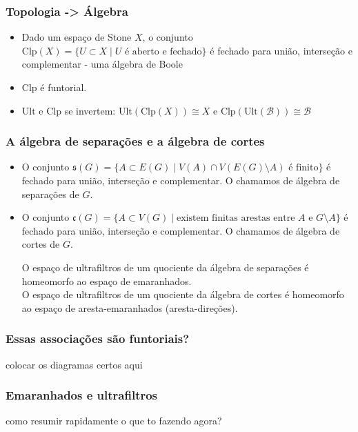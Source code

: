 \begin{frame}{}
\frametitle{Topologia -> Álgebra}
    \begin{itemize}
        \item Dado um espaço de Stone $X$, o conjunto $\text{Clp}(X) = \{U \subset X \mid U \text{ é aberto e fechado}\}$ é fechado para união, interseção e complementar - uma álgebra de Boole \pause
        \item $\text{Clp}$ é funtorial. \pause
        \item $\text{Ult}$ e $\text{Clp}$ se invertem: $\text{Ult}(\text{Clp}(X)) \cong X$  e $\text{Clp}(\text{Ult}(\mathcal{B})) \cong \mathcal{B}$
    \end{itemize} 
\end{frame}

\begin{frame}{}
\frametitle{A álgebra de separações e a álgebra de cortes}
    \begin{itemize}
        \item O conjunto $\mathfrak{s}(G) = \{A \subset E(G) \mid V(A) \cap V(E(G) \setminus A) \text{ é finito}\}$ é fechado para união, interseção e complementar. O chamamos de álgebra de separações de $G$. \pause
        \item O conjunto $\mathfrak{c}(G) = \{A \subset V(G) \mid \text{existem finitas arestas entre } A \text{ e } G \setminus A\}$ é fechado para união, interseção e complementar. O chamamos de álgebra de cortes de $G$. \pause
    \begin{theorem}
        O espaço de ultrafiltros de um quociente da álgebra de separações é homeomorfo ao espaço de emaranhados.\\
        O espaço de ultrafiltros de um quociente da álgebra de cortes é homeomorfo ao espaço de aresta-emaranhados (aresta-direções).
    \end{theorem}
    \end{itemize} 
\end{frame}

\begin{frame}{}
\frametitle{Essas associações são funtoriais?}
colocar os diagramas certos aqui
\end{frame}

\begin{frame}{}
\frametitle{Emaranhados e ultrafiltros}
como resumir rapidamente o que to fazendo agora?
\end{frame}




